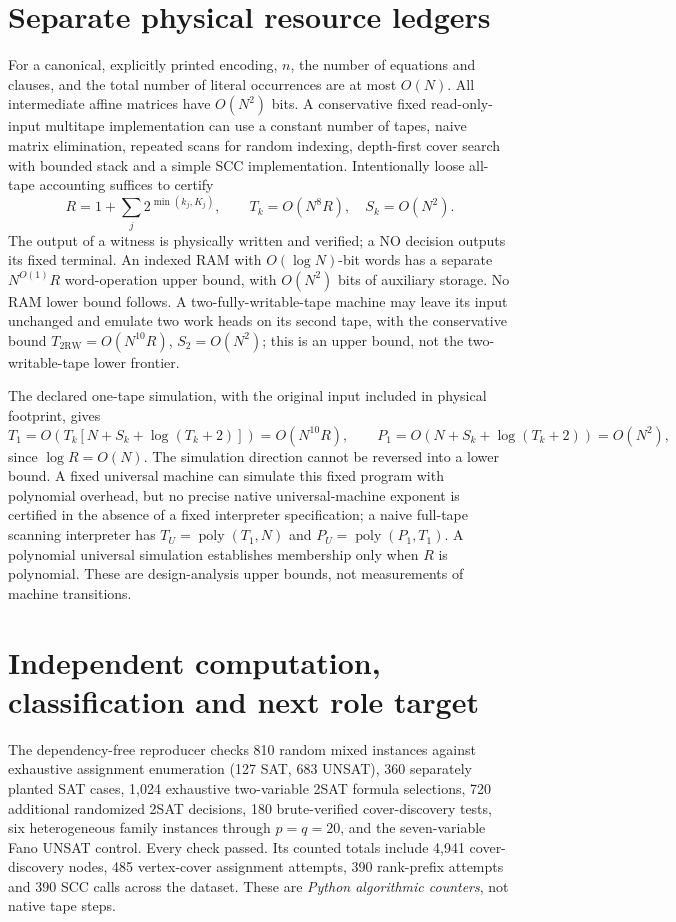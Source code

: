 \documentclass[11pt]{article}
\newcommand{\poly}{\operatorname{poly}}
\begin{document}
\section{Separate physical resource ledgers}
For a canonical, explicitly printed encoding, $n$, the number of equations and clauses, and the total number of literal occurrences are at most $O(N)$. All intermediate affine matrices have $O(N^2)$ bits. A conservative fixed read-only-input multitape implementation can use a constant number of tapes, naive matrix elimination, repeated scans for random indexing, depth-first cover search with bounded stack and a simple SCC implementation. Intentionally loose all-tape accounting suffices to certify
\[
 R=1+\sum_j2^{\min(k_j,K_j)},\qquad
 T_k=O(N^8R),\quad S_k=O(N^2).
\]
The output of a witness is physically written and verified; a NO decision outputs its fixed terminal. An indexed RAM with $O(\log N)$-bit words has a separate $N^{O(1)}R$ word-operation upper bound, with $O(N^2)$ bits of auxiliary storage. No RAM lower bound follows. A two-fully-writable-tape machine may leave its input unchanged and emulate two work heads on its second tape, with the conservative bound $T_{2\mathrm{RW}}=O(N^{10}R)$, $S_2=O(N^2)$; this is an upper bound, not the two-writable-tape lower frontier.

The declared one-tape simulation, with the original input included in physical footprint, gives
\[
 T_1=O(T_k[N+S_k+\log(T_k+2)])=O(N^{10}R),\qquad
 P_1=O(N+S_k+\log(T_k+2))=O(N^2),
\]
since $\log R=O(N)$. The simulation direction cannot be reversed into a lower bound. A fixed universal machine can simulate this fixed program with polynomial overhead, but no precise native universal-machine exponent is certified in the absence of a fixed interpreter specification; a naive full-tape scanning interpreter has $T_U=\poly(T_1,N)$ and $P_U=\poly(P_1,T_1)$. A polynomial universal simulation establishes membership only when $R$ is polynomial. These are design-analysis upper bounds, not measurements of machine transitions.

\section{Independent computation, classification and next role target}
The dependency-free reproducer checks 810 random mixed instances against exhaustive assignment enumeration (127 SAT, 683 UNSAT), 360 separately planted SAT cases, 1,024 exhaustive two-variable 2SAT formula selections, 720 additional randomized 2SAT decisions, 180 brute-verified cover-discovery tests, six heterogeneous family instances through $p=q=20$, and the seven-variable Fano UNSAT control. Every check passed. Its counted totals include 4,941 cover-discovery nodes, 485 vertex-cover assignment attempts, 390 rank-prefix attempts and 390 SCC calls across the dataset. These are \emph{Python algorithmic counters}, not native tape steps.
\end{document}
